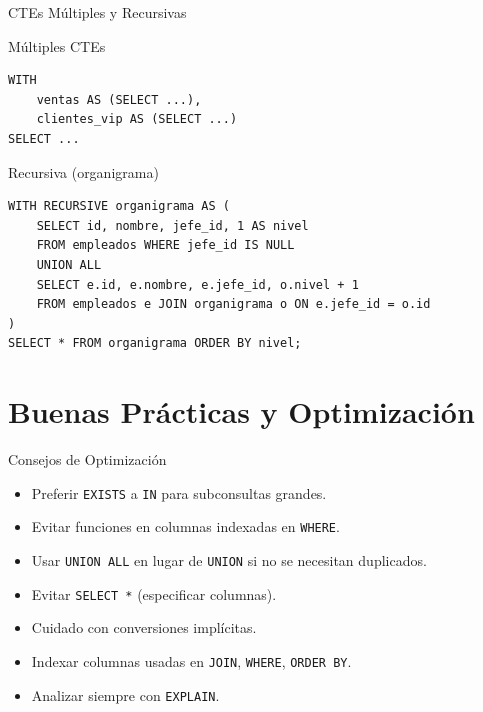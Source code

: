 \documentclass[aspectratio=169, 10pt, xcolor=table]{beamer}
\begin{document}
\begin{frame}[fragile]{CTEs Múltiples y Recursivas}
    \begin{block}{Múltiples CTEs}
        \begin{lstlisting}
WITH
    ventas AS (SELECT ...),
    clientes_vip AS (SELECT ...)
SELECT ...
        \end{lstlisting}
    \end{block}
    \begin{block}{Recursiva (organigrama)}
        \begin{lstlisting}
WITH RECURSIVE organigrama AS (
    SELECT id, nombre, jefe_id, 1 AS nivel
    FROM empleados WHERE jefe_id IS NULL
    UNION ALL
    SELECT e.id, e.nombre, e.jefe_id, o.nivel + 1
    FROM empleados e JOIN organigrama o ON e.jefe_id = o.id
)
SELECT * FROM organigrama ORDER BY nivel;
        \end{lstlisting}
    \end{block}
\end{frame}

\section{Buenas Prácticas y Optimización}

\begin{frame}{Consejos de Optimización}
    \begin{itemize}
        \item Preferir \texttt{EXISTS} a \texttt{IN} para subconsultas grandes.
        \item Evitar funciones en columnas indexadas en \texttt{WHERE}.
        \item Usar \texttt{UNION ALL} en lugar de \texttt{UNION} si no se necesitan duplicados.
        \item Evitar \texttt{SELECT *} (especificar columnas).
        \item Cuidado con conversiones implícitas.
        \item Indexar columnas usadas en \texttt{JOIN}, \texttt{WHERE}, \texttt{ORDER BY}.
        \item Analizar siempre con \texttt{EXPLAIN}.
    \end{itemize}
\end{frame}
\end{document}
